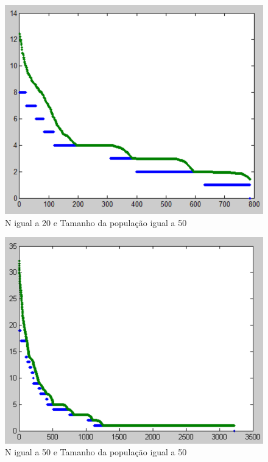 \documentclass[12pt, a4paper]{article}
\begin{document}
\begin{figure}[h]
	\centering
	\includegraphics[width=15cm]{img/n20.png}
	\caption{N igual a 20 e Tamanho da população igual a 50}
	\label{fig:n20}
\end{figure}  

\begin{figure}[h]
	\centering
	\includegraphics[width=15cm]{img/n50.png}
	\caption{N igual a 50 e Tamanho da população igual a 50}
	\label{fig:n50}
\end{figure}  
		
\end{document}
